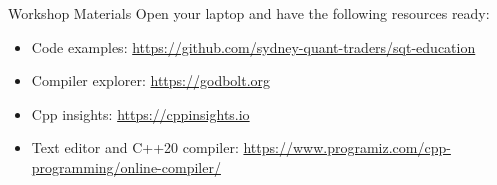 \begin{frame}[fragile]{Workshop Materials}
  Open your laptop and have the following resources ready:
  \begin{itemize}
    \item Code examples: \href{https://github.com/sydney-quant-traders/sqt-education}{https://github.com/sydney-quant-traders/sqt-education}
    \item Compiler explorer: \href{https://godbolt.org}{https://godbolt.org}
    \item Cpp insights: \href{https://cppinsights.io}{https://cppinsights.io}
    \item Text editor and C++20 compiler: \href{https://www.programiz.com/cpp-programming/online-compiler/}{https://www.programiz.com/cpp-programming/online-compiler/}
  \end{itemize}
\end{frame}
  